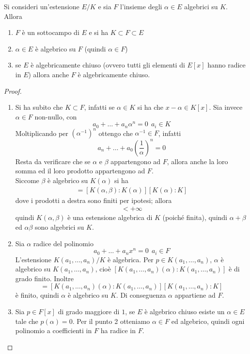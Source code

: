 \begin{teorema}
	Si consideri un'estensione $E/K$ e sia $F$ l'insieme degli $\alpha\in E$ algebrici su $K$. Allora
	\begin{enumerate}
		\item $F$ è un sottocampo di $E$ e si ha $K\subset F\subset E$
		\item $\alpha\in E$ è algebrico su $F$ (quindi $\alpha\in F$)
		\item se $E$ è algebricamente chiuso (ovvero tutti gli elementi di $E[x]$ hanno radice in $E$) allora anche $F$ è algebricamente chiuso.
	\end{enumerate}
\end{teorema}
\begin{proof}\
	\begin{enumerate}
		\item Si ha subito che $K \subset F$, infatti se $\alpha\in K$ si ha che $x-\alpha \in K[x]$. Sia invece $\alpha\in F$ non-nullo, con
		\begin{equation*}
		a_0+\dots+a_n\alpha^n = 0 \ \ a_i \in K
		\end{equation*}
		Moltiplicando per $(\alpha^{-1})^n$ ottengo che $\alpha^{-1}\in F$, infatti
		\begin{equation*}
		a_n+\dots+a_0\left(\frac{1}{\alpha}\right)^n = 0
		\end{equation*}
		Resta da verificare che se $\alpha$ e $\beta$ appartengono ad $F$, allora anche la loro somma ed il loro prodotto appartengono ad $F$. \\ Siccome $\beta$ è algebrico su $K(\alpha)$ si ha 
		\begin{align*}
		[K(\alpha)(\beta):K]=[K(\alpha,\beta):K(\alpha)][K(\alpha):K]
		\end{align*}
		dove i prodotti a destra sono finiti per ipotesi; allora
		\begin{align*}
		[K(\alpha,\beta):K] < +\infty
		\end{align*}
		quindi $K(\alpha,\beta)$ è una estensione algebrica di $K$ (poiché finita), quindi $\alpha+\beta$ ed $\alpha\beta$ sono algebrici su $K$.
		\item Sia $\alpha$ radice del polinomio
		\begin{equation*}
		a_0+\dots+a_nx^n = 0 \ \ a_i \in F
		\end{equation*}
		L'estensione $K(a_1,\dots,a_n)/K$ è algebrica. Per $p\in K(a_1,\dots,a_n)$, $\alpha$ è algebrico su $K(a_1,\dots,a_n)$, cioè $[K(a_1,\dots,a_n)(\alpha):K(a_1,\dots,a_n)]$ è di grado finito. Inoltre
		\begin{equation*}
		[K(a_1,\dots,a_n)(\alpha):K]=[K(a_1,\dots,a_n)(\alpha):K(a_1,\dots,a_n)][K(a_1,\dots,a_n):K]
		\end{equation*}
		è finito, quindi $\alpha$ è algebrico su $K$. Di conseguenza $\alpha$ appartiene ad $F$.
		\item Sia $p\in F[x]$ di grado maggiore di $1$, se $E$ è algebrico chiuso esiste un $\alpha\in E$ tale che $p(\alpha)=0$. Per il punto 2 otteniamo $\alpha\in F$ ed algebrico, quindi ogni polinomio a coefficienti in $F$ ha radice in $F$.
	\end{enumerate}
\end{proof}
